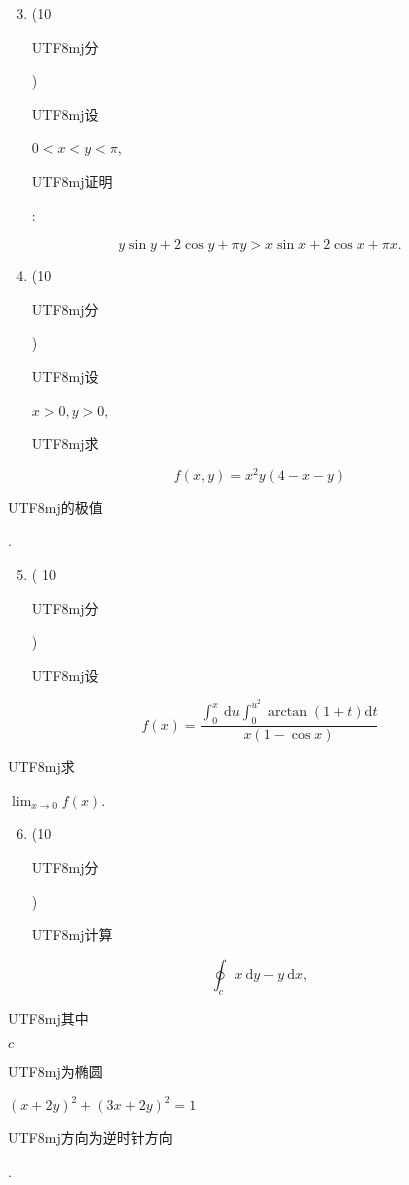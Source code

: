 \documentclass[10pt]{article}
\begin{document}
\begin{enumerate}
  \setcounter{enumi}{2}
  \item (10 \begin{CJK}{UTF8}{mj}分\end{CJK}) \begin{CJK}{UTF8}{mj}设\end{CJK} $0<x<y<\pi$, \begin{CJK}{UTF8}{mj}证明\end{CJK}:
\end{enumerate}
$$
y \sin y+2 \cos y+\pi y>x \sin x+2 \cos x+\pi x .
$$

\begin{enumerate}
  \setcounter{enumi}{3}
  \item (10 \begin{CJK}{UTF8}{mj}分\end{CJK}) \begin{CJK}{UTF8}{mj}设\end{CJK} $x>0, y>0$, \begin{CJK}{UTF8}{mj}求\end{CJK}
\end{enumerate}
$$
f(x, y)=x^{2} y(4-x-y)
$$
\begin{CJK}{UTF8}{mj}的极值\end{CJK}.

\begin{enumerate}
  \setcounter{enumi}{4}
  \item ( 10 \begin{CJK}{UTF8}{mj}分\end{CJK}) \begin{CJK}{UTF8}{mj}设\end{CJK}
\end{enumerate}
$$
f(x)=\frac{\int_{0}^{x} \mathrm{~d} u \int_{0}^{u^{2}} \arctan (1+t) \mathrm{d} t}{x(1-\cos x)}
$$
\begin{CJK}{UTF8}{mj}求\end{CJK} $\lim _{x \rightarrow 0} f(x)$.

\begin{enumerate}
  \setcounter{enumi}{5}
  \item (10 \begin{CJK}{UTF8}{mj}分\end{CJK}) \begin{CJK}{UTF8}{mj}计算\end{CJK}
\end{enumerate}
$$
\oint_{c} x \mathrm{~d} y-y \mathrm{~d} x,
$$
\begin{CJK}{UTF8}{mj}其中\end{CJK} $c$ \begin{CJK}{UTF8}{mj}为椭圆\end{CJK} $(x+2 y)^{2}+(3 x+2 y)^{2}=1$ \begin{CJK}{UTF8}{mj}方向为逆时针方向\end{CJK}.
\end{document}
